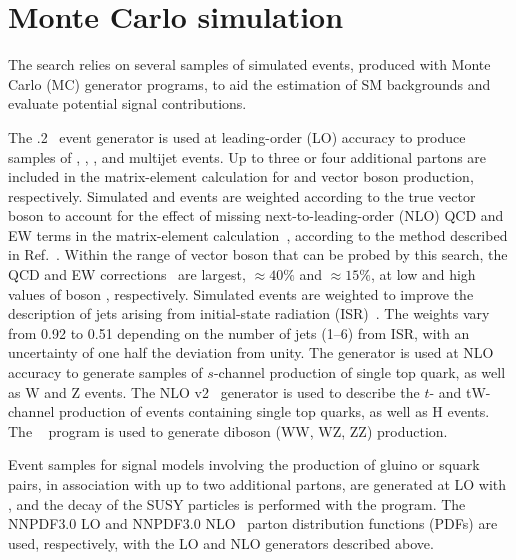 \section{Monte Carlo simulation}
\label{sec:simulation}

The search relies on several samples of simulated events, produced
with Monte Carlo (MC) generator programs, to aid the estimation of SM
backgrounds and evaluate potential signal contributions.

The .2~\cite{Alwall2014} event generator is used at
leading-order (LO) accuracy to produce samples of \wj, \zj, \ttbar,
and multijet events. Up to three or four additional partons are
included in the matrix-element calculation for \ttbar and vector boson
production, respectively. Simulated \wj and \zj events are weighted
according to the true vector boson \pt to account for the effect of
missing next-to-leading-order (NLO) QCD and EW terms in the
matrix-element calculation~\cite{Alwall2014, Kuhn:2005gv}, according
to the method described in Ref.~\cite{Khachatryan:2016mdm}. Within the
range of vector boson \pt that can be probed by this search, the QCD
and EW corrections~\cite{Kuhn:2005gv} are largest, ${\approx}40\%$ and
${\approx}15\%$, at low and high values of boson \pt,
respectively. Simulated \ttbar events are weighted to improve the
description of jets arising from initial-state radiation
(ISR)~\cite{Chatrchyan:2013xna}. The weights vary from 0.92 to 0.51
depending on the number of jets (1--6) from ISR, with an uncertainty
of one half the deviation from unity. The \MGvATNLO generator is used
at NLO accuracy to generate samples of $s$-channel production of
single top quark, as well as {\ttbar}W and {\ttbar}Z events. The NLO
\POWHEG v2~\cite{powheg, powheg_top_Wt} generator is used to describe
the $t$- and tW-channel production of events containing single top
quarks, as well as {\ttbar}H events. The ~\cite{pythia}
program is used to generate diboson (WW, WZ, ZZ) production.

Event samples for signal models involving the production of gluino or
squark pairs, in association with up to two additional partons, are
generated at LO with \MGvATNLO, and the decay of the SUSY particles is
performed with the \PYTHIA program. The \textsc{NNPDF}3.0 LO and
\textsc{NNPDF}3.0 NLO~\cite{nnpdf} parton distribution functions
(PDFs) are used, respectively, with the LO and NLO generators
described above.

